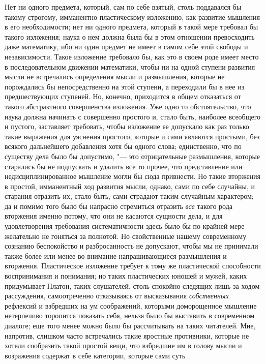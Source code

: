 Нет ни одного предмета, который, сам по себе взятый, столь поддавался бы такому
строгому, имманентно пластическому изложению, как развитие мышления в его
необходимости; нет ни одного предмета, который в такой мере требовал бы такого
изложения; наука о нем должна была бы в этом отношении превосходить даже
математику, ибо ни один предмет не имеет в самом себе этой свободы и
независимости. Такое изложение требовало бы, как это в своем роде имеет место в
последовательном движении математики, чтобы ни на одной ступени развития мысли
не встречались определения мысли и размышления, которые не порождались бы
непосредственно на этой ступени, а переходили бы в нее из предшествующих
ступеней. Но, конечно, приходится в общем отказаться от такого абстрактного
совершенства изложения. Уже одно то обстоятельство, что наука должна начинать с
совершенно простого и, стало быть, наиболее всеобщего и пустого, заставляет
требовать, чтобы изложение ее допускало как раз только такие выражения для
уяснения простого, которые и сами являются простыми, без всякого дальнейшего
добавления хотя бы одного слова; единственно, что по существу дела было бы
допустимо, "--- это отрицательные размышления, которые старались бы не
подпускать и удалить все то прочее, чт\'{о} представление или
недисциплинированное мышление могли бы сюда привнести. Но такие вторжения в
простой, имманентный ход развития мысли, однако, сами по себе случайны, и
старания отразить их, стало быть, сами страдают таким случайным характером; да
и помимо того было бы напрасно стремиться отразить {\em все} такого рода вторжения
именно потому, что они не касаются сущности дела, и для удовлетворения
требования систематичности здесь было бы по крайней мере желательно не гоняться
за полнотой. Но свойственные нашему современному сознанию беспокойство и
разбросанность не допускают, чтобы мы не принимали также более или менее во
внимание напрашивающиеся размышления и вторжения. Пластическое изложение
требует к тому же пластической способности воспринимания и понимания; но таких
пластических юношей и мужей, каких придумывает Платон, таких слушателей, столь
спокойно следящих лишь за ходом рассуждения, самоотреченно отказываясь от
высказывания {\em собственных} рефлексий и взбредших на ум соображений,
которыми доморощенное мышление нетерпеливо торопится показать себя, нельзя было
бы выставить в современном диалоге; еще того менее можно было бы рассчитывать
на таких читателей. Мне, напротив, слишком часто встречались такие яростные
противники, которые не хотели сообразить такой простой вещи, что взбредшие им в
голову мысли и возражения содержат в себе категории, которые сами суть
